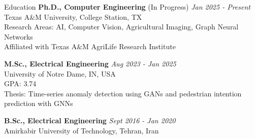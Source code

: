 \documentclass{resume} %
\begin{document}
\begin{rSection}{Education}
{\bf Ph.D., Computer Engineering} (In Progress) \hfill {\em Jan 2025 - Present}\\
Texas A\&M University, College Station, TX\\
Research Areas: AI, Computer Vision, Agricultural Imaging, Graph Neural Networks\\
Affiliated with Texas A\&M AgriLife Research Institute

{\bf M.Sc., Electrical Engineering} \hfill {\em Aug 2023 - Jan 2025}\\
University of Notre Dame, IN, USA\\
GPA: 3.74\\
Thesis: Time-series anomaly detection using GANs and pedestrian intention prediction with GNNs

{\bf B.Sc., Electrical Engineering} \hfill {\em Sept 2016 - Jan 2020}\\
Amirkabir University of Technology, Tehran, Iran
\end{rSection}
\end{document}
